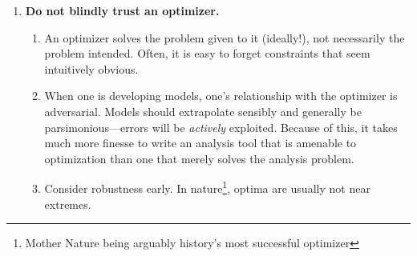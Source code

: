 \begin{enumerate}
\begin{enumerate}
        \item Analysis results used in MDO should be an \emph{unbiased} estimator of the author's belief state about some quantity. This is often \emph{not} the raw output of a first-principles physics model, since these often bias optimistic due to assumptions\footnote{As aerospace examples: a) a RANS CFD study on defeatured geometry that ignores flap track fairings, skin gaps, or protuberances; b) an XFoil analysis that assumes laminar flow beyond a line of leading-edge rivets; or c) a wing weight build-up that neglects \emph{expected} weight growth during detailed design. These expected biases should be corrected, and these corrections \emph{do not count as margin}.}. A good rough litmus test for biased outputs is to consider whether one would be more surprised to learn that the model was erring high versus low—these should ideally carry roughly equal surprise.
        \item Account for margin explicitly, and usually only in top-level closure loops and parameters (weight, drag, power, load factor, etc.). Remember that margin is performance beyond the \emph{limit} case, not the \emph{baseline} case\footnote{For example, in aircraft design, thrust margin is the excess beyond what is needed for \emph{climb} (possibly with one engine inoperative), not \emph{cruise}. If performance is \emph{ever} intended to be used during nominal limit-case operation of the system, this cannot be counted as margin.}. Also, corrections for suspected bias do not count as margin: margin is for mitigating unknown unknowns, not known unknowns.
    \end{enumerate}
    \item \textbf{Do not blindly trust an optimizer.}
    \begin{enumerate}
        \item An optimizer solves the problem given to it (ideally!), not necessarily the problem intended. Often, it is easy to forget constraints that seem intuitively obvious.
        \item When one is developing models, one's relationship with the optimizer is adversarial. Models should extrapolate sensibly and generally be parsimonious—errors will be \emph{actively} exploited. Because of this, it takes much more finesse to write an analysis tool that is amenable to optimization than one that merely solves the analysis problem.
        \item Consider robustness early. In nature\footnote{Mother Nature being arguably history's most successful optimizer}, optima are usually not near extremes.

\end{enumerate}
\end{enumerate}
